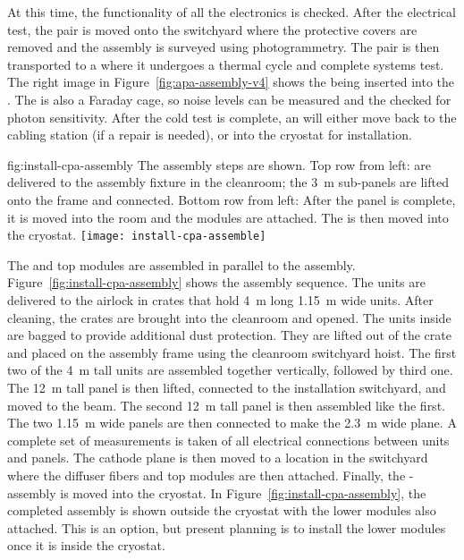 At this time, the functionality of all the electronics is checked. 
After the  electrical test, the  pair is moved onto the switchyard where the protective covers are removed and the assembly is surveyed using photogrammetry. 
The  pair is then transported to a \coldbox where it undergoes a thermal cycle and complete systems test. 
The right image in Figure~\ref{fig:apa-assembly-v4} shows the  being inserted into the \coldbox. The \coldbox is also a Faraday cage, so noise levels can be measured and the  checked for photon sensitivity. 
After the cold test is complete, an  will either move back to the cabling station (if a repair is needed), or %
into the cryostat for installation. 


\begin{dunefigure}{fig:install-cpa-assembly}
  {The  assembly steps are shown. Top row from left:   are delivered to the  assembly fixture in the cleanroom; the \SI{3}{m} sub-panels are lifted onto the frame and connected. Bottom row from left: After the  panel is complete, it is moved into the room and the  modules are attached. The  is then moved into the cryostat.}
\texttt{[image: install-cpa-assemble]}
\end{dunefigure}

The  and top  modules are assembled in parallel to the  assembly. Figure~\ref{fig:install-cpa-assembly} shows the  assembly sequence. The  units are delivered to the airlock in crates that hold  \SI{4}{m} long \SI{1.15}{m} wide units. After cleaning, the crates are brought into the cleanroom and opened. The  units inside are bagged to provide additional dust protection. They are lifted out of the crate and placed on the assembly frame using the cleanroom switchyard hoist. %
The first two of the \SI{4}{m} tall units are assembled together vertically, followed by third one.
The %
\SI{12}{m} tall  panel is then lifted, connected to the installation switchyard, and moved to the  beam. The second \SI{12}{m} tall panel is then assembled like the first. The two \SI{1.15}{m} wide panels are then connected to make the \SI{2.3}{m} wide plane.  A complete set of  measurements is taken of all electrical connections between units and panels.  The cathode plane  is then moved to a location in the switchyard where the diffuser fibers and top  modules %
 are then attached. Finally, the - assembly is moved into the cryostat.
 In Figure~\ref{fig:install-cpa-assembly}, the completed assembly is shown outside the cryostat with the lower  modules also attached. This is an option, but present planning is to install the lower  modules once it is inside the cryostat. 



